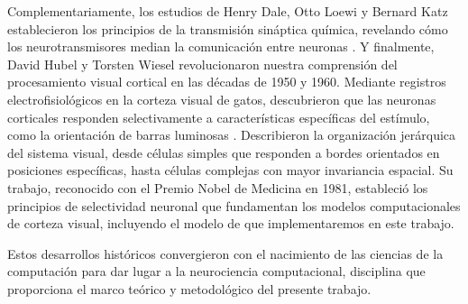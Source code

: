 
Complementariamente, los estudios de Henry Dale, Otto Loewi y Bernard Katz establecieron los principios de la transmisión sináptica química, revelando cómo los neurotransmisores median la comunicación entre neuronas \citep{blanco2014historia}. Y finalmente, David Hubel y Torsten Wiesel revolucionaron nuestra comprensión del procesamiento visual cortical en las décadas de 1950 y 1960. Mediante registros electrofisiológicos en la corteza visual de gatos, descubrieron que las neuronas corticales responden selectivamente a características específicas del estímulo, como la orientación de barras luminosas \citep{hubel1959receptive}. Describieron la organización jerárquica del sistema visual, desde células simples que responden a bordes orientados en posiciones específicas, hasta células complejas con mayor invariancia espacial. Su trabajo, reconocido con el Premio Nobel de Medicina en 1981, estableció los principios de selectividad neuronal que fundamentan los modelos computacionales de corteza visual, incluyendo el modelo de \citet{echeveste2020cortical} que implementaremos en este trabajo.


Estos desarrollos históricos convergieron con el nacimiento de las ciencias de la computación para dar lugar a la neurociencia computacional, disciplina que proporciona el marco teórico y metodológico del presente trabajo.



